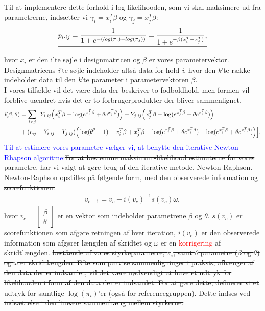 \documentclass[11pt,a4paper]{article}
\begin{document}
\sout{Til at implementere dette forhold i log-likelihooden, som vi skal maksimere ud fra parametrerne, indsætter vi $\gamma_i=x_i^T\beta$ og $\gamma_j=x_j^T\beta$:}\\
\begin{align*}
   \sout{ p_{i\cdot ij} = \frac{1}{1+ e^{-(log(\pi_i)-log(\pi_j))}} = \frac{1}{1+ e^{-\beta(x_i^T-x_j^T)}},}
\end{align*}
hvor $x_i$ er den i'te søjle i designmatricen og $\beta$ er vores parametervektor. Designmatricens \textit{i}'te søjle indeholder altså data for hold \textit{i}, hvor den \textit{k}'te række indeholder data til den \textit{k}'te parameter i parametervektoren $\beta$. \\
I vores tilfælde vil det være data der beskriver to fodboldhold, men formen vil forblive uændret hvis det er to forbrugerprodukter der bliver sammenlignet.
\begin{align*}
\textit{l}(\beta,\theta)
&=\sum_{i<j}\Big{[}Y_{i\cdot ij}\Big{(}x_i^T\beta-\log(e^{x_i^T\beta}+\theta e^{x_j^T\beta})\Big{)}
+Y_{j\cdot ij}\Big{(}x_j^T\beta-\log(e^{x_j^T\beta}+\theta e^{x_i^T\beta})\Big{)}\\
& +(r_{ij}-Y_{i\cdot ij}-Y_{j\cdot ij}) \Big{(} \log(\theta^2-1)+x_i^T\beta+x_j^T\beta-\log(e^{x_i^T\beta}+\theta e^{x_j^T\beta})-\log(e^{x_j^T\beta}+\theta e^{x_i^T\beta})\Big{)}\Big{]}.
\end{align*}
\textcolor{blue}{Til at estimere vores parametre vælger vi, at benytte den iterative Newton-Rhapson algoritme:}\sout{For at bestemme maksimum-likelihood estimaterne for vores parametre, har vi valgt at gøre brug af den iterative metode, Newton-Raphson. Newton-Raphson opstilles på følgende form, med den observerede information og scorefunktionen:}
\begin{align*}
v_{c+1} = v_{c} + i(v_{c})^{-1}s(v_{c})\omega,
\end{align*}
hvor $v_{c}=\begin{bmatrix} \beta\\\theta\end{bmatrix}$ er en vektor som indeholder parametrene $\beta$ og $\theta$. $s(v_{c})$ er scorefunktionen som afgøre retningen af hver iteration, $i(v_c)$ er den observerede information som afgører længden af skridtet og $\omega$ er en \textcolor{red}{korrigering} af skridtlængden. \sout{ bestående af vores styrkeparametre, $\pi_i$, samt $\theta$ parametre ($\beta$ og $\theta$) og $\omega$ er skridtlængden. Eftersom parvise sammenligninger i praksis, afhænger af den data der er indsamlet, vil det være nødvendigt at have et udtryk for likelihooden i form af den data der er indsamlet. For at gøre dette, definerer vi et udtryk for samtlige $\log( \pi_i)$'er (også for referencegruppen). Dette indses ved indsættelse i den lineære sammenhæng mellem styrkerne:}
\end{document}
